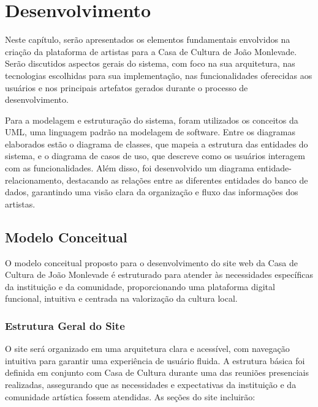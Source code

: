 \chapter{Desenvolvimento}
\label{cap:desenvolvimento}
Neste capítulo, serão apresentados os elementos fundamentais envolvidos na criação da plataforma de artistas para a Casa de Cultura de João Monlevade. Serão discutidos aspectos gerais do sistema, com foco na sua arquitetura, nas tecnologias escolhidas para sua implementação, nas funcionalidades oferecidas aos usuários e nos principais artefatos gerados durante o processo de desenvolvimento.

Para a modelagem e estruturação do sistema, foram utilizados os conceitos da UML, uma linguagem padrão na modelagem de software. Entre os diagramas elaborados estão o diagrama de classes, que mapeia a estrutura das entidades do sistema, e o diagrama de casos de uso, que descreve como os usuários interagem com as funcionalidades. Além disso, foi desenvolvido um diagrama entidade-relacionamento, destacando as relações entre as diferentes entidades do banco de dados, garantindo uma visão clara da organização e fluxo das informações dos artistas.

\section{Modelo Conceitual}

O modelo conceitual proposto para o desenvolvimento do site web da Casa de Cultura de João Monlevade é estruturado para atender às necessidades específicas da instituição e da comunidade, proporcionando uma plataforma digital funcional, intuitiva e centrada na valorização da cultura local.

\subsection{Estrutura Geral do Site}

O site será organizado em uma arquitetura clara e acessível, com navegação intuitiva para garantir uma experiência de usuário fluida. A estrutura básica foi definida em conjunto com Casa de Cultura durante uma das reuniões presenciais realizadas, assegurando que as necessidades e expectativas da instituição e da comunidade artística fossem atendidas. As seções do site incluirão:

